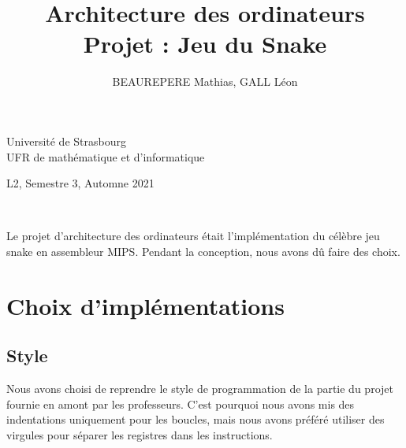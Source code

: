 \documentclass[a4paper]{article}
\title{Architecture des ordinateurs\\\large Projet : Jeu du Snake}
\author{BEAUREPERE Mathias, GALL Léon}
\date{}
\begin{document}
\hspace{-0.5cm}\begin{minipage}{0.5\textwidth}
Université de Strasbourg\\
UFR de mathématique et d'informatique
\end{minipage}
\hspace*{\fill}\begin{minipage}{0.5\textwidth}
\hspace*{\fill}L2, Semestre 3, Automne 2021\\
\hspace*{\fill}\@author
\end{minipage}
\\
\begin{center}
  \huge \@title
\end{center}
\vspace*{1cm}


Le projet d'architecture des ordinateurs était l'implémentation du célèbre jeu snake en assembleur MIPS.
Pendant la conception, nous avons dû faire des choix.

\section{Choix d'implémentations}

\subsection{Style}
Nous avons choisi  de reprendre le style de programmation de la partie du projet fournie en amont par les professeurs.
C'est pourquoi nous avons mis des indentations uniquement pour les boucles, mais nous avons préféré utiliser des virgules
pour séparer les registres dans les instructions.
\end{document}
